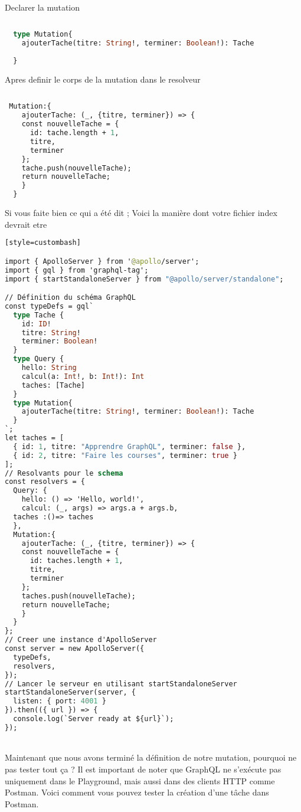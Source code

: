 \documentclass{article}
\begin{document}
Declarer la mutation
  \begin{lstlisting}[language=GraphQL,basicstyle=\ttfamily\small]
    
  type Mutation{
    ajouterTache(titre: String!, terminer: Boolean!): Tache
  
  }
\end{lstlisting}
Apres definir le corps de la mutation dans le resolveur 
\newpage
  \begin{lstlisting}[language=GraphQL,basicstyle=\ttfamily\small]
    
 Mutation:{
    ajouterTache: (_, {titre, terminer}) => {
    const nouvelleTache = {
      id: tache.length + 1,
      titre,
      terminer
    };
    tache.push(nouvelleTache);
    return nouvelleTache;
    }
  }

\end{lstlisting}
Si vous faite bien ce qui a été dit ; Voici la manière dont votre fichier index devrait etre 
  \begin{lstlisting}[language=GraphQL,basicstyle=\ttfamily\small][style=custombash]

import { ApolloServer } from '@apollo/server';
import { gql } from 'graphql-tag';
import { startStandaloneServer } from "@apollo/server/standalone"; 

// Définition du schéma GraphQL
const typeDefs = gql`
  type Tache {
    id: ID!
    titre: String!
    terminer: Boolean!
  }
  type Query {
    hello: String
    calcul(a: Int!, b: Int!): Int
    taches: [Tache]
  }
  type Mutation{
    ajouterTache(titre: String!, terminer: Boolean!): Tache
  }
`;
let taches = [
  { id: 1, titre: "Apprendre GraphQL", terminer: false },
  { id: 2, titre: "Faire les courses", terminer: true }
];
// Resolvants pour le schema
const resolvers = {
  Query: {
    hello: () => 'Hello, world!',
    calcul: (_, args) => args.a + args.b,   
  taches :()=> taches
  },
  Mutation:{
    ajouterTache: (_, {titre, terminer}) => {
    const nouvelleTache = {
      id: taches.length + 1,
      titre,
      terminer
    };
    taches.push(nouvelleTache);
    return nouvelleTache;
    }
  }
};
// Creer une instance d'ApolloServer
const server = new ApolloServer({
  typeDefs,
  resolvers,
});
// Lancer le serveur en utilisant startStandaloneServer
startStandaloneServer(server, {
  listen: { port: 4001 }
}).then(({ url }) => {
  console.log(`Server ready at ${url}`);
});
\end{lstlisting}\\

Maintenant que nous avons terminé la définition de notre mutation, pourquoi ne pas tester tout ça ? Il est important de noter que GraphQL ne s'exécute pas uniquement dans le Playground, mais aussi dans des clients HTTP comme Postman. Voici comment vous pouvez tester la création d'une tâche dans Postman.
\end{document}
